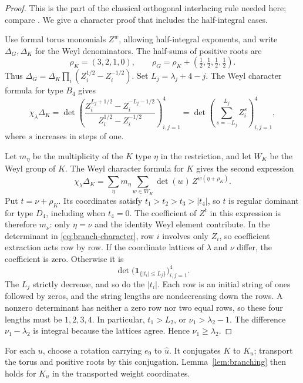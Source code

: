 \documentclass[11pt]{amsart}
\theoremstyle{remark}
\numberwithin{equation}{section}
\begin{document}
\begin{proof}
This is the part of the classical orthogonal interlacing rule needed
here; compare \cite[Proposition~3.7]{BisiZygouras}. We give a character
proof that includes the half-integral cases.

Use formal torus monomials $Z^w$, allowing half-integral exponents, and
write $\Delta_G,\Delta_K$ for the Weyl denominators. The half-sums of
positive roots are
\[
 \rho_K=(3,2,1,0),\qquad
 \rho_G=\rho_K+(\tfrac12,\tfrac12,\tfrac12,\tfrac12).
\]
Thus
$\Delta_G=\Delta_K\prod_i(Z_i^{1/2}-Z_i^{-1/2})$.
Set $L_j=\lambda_j+4-j$. The Weyl character formula for type $B_4$
gives
\begin{equation}
 \chi_\lambda\Delta_K
 =\det\left(
   \frac{Z_i^{L_j+1/2}-Z_i^{-L_j-1/2}}
        {Z_i^{1/2}-Z_i^{-1/2}}
       \right)_{i,j=1}^4
 =\det\left(\sum_{s=-L_j}^{L_j}Z_i^s\right)_{i,j=1}^4,
 \label{eq:branch-character}
\end{equation}
where $s$ increases in steps of one.

Let $m_\eta$ be the multiplicity of the $K$ type $\eta$ in the
restriction, and let $W_K$ be the Weyl group of $K$. The Weyl
character formula for $K$ gives the second expression
\[
 \chi_\lambda\Delta_K
 =\sum_\eta m_\eta\sum_{w\in W_K}\det(w)\,
       Z^{w(\eta+\rho_K)}.
\]
Put $t=\nu+\rho_K$. Its coordinates satisfy
$t_1>t_2>t_3>|t_4|$, so $t$ is regular dominant for type $D_4$,
including when $t_4=0$. The coefficient of $Z^t$ in this expression
is therefore $m_\nu$: only $\eta=\nu$ and the identity Weyl element
contribute. In the determinant in \eqref{eq:branch-character}, row
$i$ involves only $Z_i$, so coefficient extraction acts row by row.
If the coordinate lattices of $\lambda$ and $\nu$ differ, the
coefficient is zero. Otherwise it is
\[
 \det\bigl(\mathbf1_{\{|t_i|\leq L_j\}}\bigr)_{i,j=1}^4.
\]
The $L_j$ strictly decrease, and so do the $|t_i|$. Each row is an
initial string of ones followed by zeros, and the string lengths are
nondecreasing down the rows. A nonzero determinant has neither a zero
row nor two equal rows, so these four lengths must be $1,2,3,4$.
In particular,
$t_1>L_2$, or $\nu_1>\lambda_2-1$. The difference
$\nu_1-\lambda_2$ is integral because the lattices agree. Hence
$\nu_1\geq\lambda_2$.
\end{proof}

For each $u$, choose a rotation carrying $e_9$ to $\widehat u$.
It conjugates $K$ to $K_u$; transport the torus and positive roots
by this conjugation. Lemma~\ref{lem:branching} then holds for $K_u$
in the transported weight coordinates.
\end{document}
